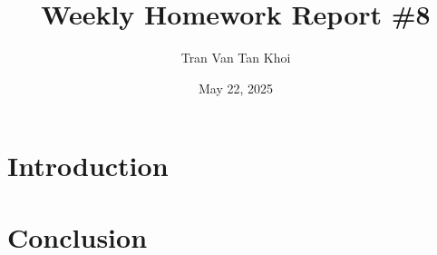 \documentclass{article}
\author{Tran Van Tan Khoi}
\date{May 22, 2025}
\title{Weekly Homework Report \#8}
\begin{document}
\maketitle

\section{Introduction}
\label{introduction}

\section{Conclusion}
\label{conclusion}
\end{document}
